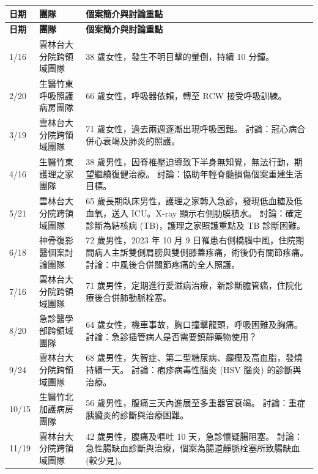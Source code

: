 \documentclass[nols]{tufte-book}
\begin{document}
\begin{longtable}{p{2cm}p{5cm}p{8cm}}
    \hline
    \textbf{日期} & \textbf{團隊} & \textbf{個案簡介與討論重點} \\
    \hline
    \endfirsthead

    \hline
    \textbf{日期} & \textbf{團隊} & \textbf{個案簡介與討論重點} \\
    \hline
    \endhead

    \hline
    \endfoot

    \hline
    \endlastfoot

    1/16 & 雲林台大分院跨領域團隊 & 38 歲女性，發生不明目擊的暈倒，持續 10 分鐘。 \\
    \hline
    2/20 & 生醫竹東呼吸照護病房團隊 & 66 歲女性，呼吸器依賴，轉至 RCW 接受呼吸訓練。 \\
    \hline
    3/19 & 雲林台大分院跨領域團隊 & 71 歲女性，過去兩週逐漸出現呼吸困難。 討論：冠心病合併心衰竭及肺炎的照護。 \\
    \hline
    4/16 & 生醫竹東護理之家團隊 & 38 歲男性，因脊椎壓迫導致下半身無知覺，無法行動，期望繼續復健治療。 討論：協助年輕脊髓損傷個案重建生活目標。 \\
    \hline
    5/21 & 雲林台大分院跨領域團隊 & 65 歲長期臥床男性，護理之家轉入急診，發現低血糖及低血氧，送入 ICU。X-ray 顯示右側肋膜積水。 討論：確定診斷為結核病 (TB)，護理之家照護重點及 TB 診斷困難。 \\
    \hline
    6/18 & 神骨復影醫個案討論團隊 & 72 歲男性，2023 年 10 月 9 日罹患右側橋腦中風，住院期間病人主訴雙側肩膀與雙側膝蓋疼痛，術後仍有關節疼痛。 討論：中風後合併關節疼痛的全人照護。 \\
    \hline
    7/16 & 雲林台大分院跨領域團隊 & 71 歲男性，定期進行愛滋病治療，新診斷膽管癌，住院化療後合併肺動脈栓塞。 \\
    \hline
    8/20 & 急診醫學部跨領域團隊 & 64 歲女性，機車事故，胸口撞擊龍頭，呼吸困難及胸痛。 討論：急診插管病人是否需要鎮靜藥物使用？ \\
    \hline
    9/24 & 雲林台大分院跨領域團隊 & 68 歲男性，失智症、第二型糖尿病、癲癇及高血脂，發燒持續一天。 討論：疱疹病毒性腦炎 (HSV 腦炎) 的診斷與治療。 \\
    \hline
    10/15 & 生醫竹北加護病房團隊 & 56 歲男性，腹痛三天內進展至多重器官衰竭。 討論：重症胰臟炎的診斷與治療困難。 \\
    \hline
    11/19 & 雲林台大分院跨領域團隊 & 42 歲男性，腹痛及嘔吐 10 天，急診懷疑腸阻塞。 討論：急性腸缺血診斷與治療，個案為腸道靜脈栓塞所致腸缺血 (較少見)。 \\
    \hline
\end{longtable}
\end{document}
